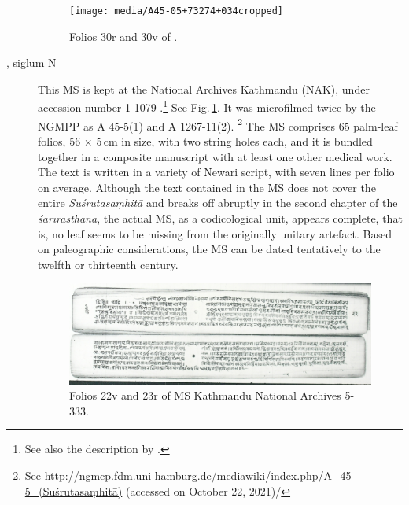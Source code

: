 \begin{description}
    \begin{figure}[t]
        \centering
        \texttt{[image: media/A45-05+73274+034cropped]}
        \caption{Folios 30r and 30v of .}
        \label{fig:a45-0573274044}
    \end{figure}
    
    \item[\MS{Kathmandu NAK 1-1079}, siglum N] This MS is kept at the National
Archives Kathmandu (NAK), under accession number 1-1079
.\footnote{See also the description by \citet[\S
    2.2]{kleb-2021b}.} See Fig.\,\ref{fig:a45-0573274044}. It was microfilmed
    twice by the NGMPP as A 45-5(1) and A 1267-11(2).%
    \footnote{%
        See 
        \url{http://ngmcp.fdm.uni-hamburg.de/mediawiki/index.php/A_45-5_(Suśrutasaṃhitā)}
         (accessed on October 22, 2021)/ } The MS comprises 65 palm-leaf folios, 56 
        $\times$ 5\,cm in size, with two string holes each, and it is bundled together in a 
        composite manuscript with at least one other medical work. The text is written in 
        a variety of Newari script, with seven lines per folio on average. Although the text 
        contained in the MS does not cover the entire \emph{Suśrutasaṃhitā} and breaks 
        off abruptly in the second chapter of the \emph{śārīrasthāna}, the actual MS, as a 
        codicological unit, appears complete, that is, no leaf seems to be missing from the 
        originally unitary artefact. Based on paleographic considerations, the MS can be 
        dated tentatively to the twelfth or thirteenth century.
    
    \begin{figure}[t]
        \centering
        \includegraphics[draft=false,width=1\linewidth]{"media/dscn2998 fol 022cropped"}
        \caption{Folios 22v and 23r of MS Kathmandu National Archives 5-333.}
        \label{fig:dscn2998-fol-022cropped}
    \end{figure}
    

\end{description}
